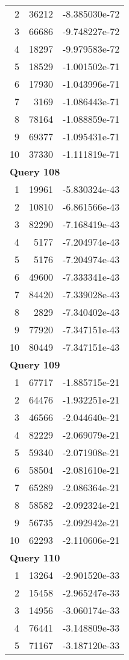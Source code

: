 \begin{longtable}[{p}]{@{}rrp{}@{}}
2 & 36212 & -8.385030e-72 \\
3 & 66686 & -9.748227e-72 \\
4 & 18297 & -9.979583e-72 \\
5 & 18529 & -1.001502e-71 \\
6 & 17930 & -1.043996e-71 \\
7 & 3169 & -1.086443e-71 \\
8 & 78164 & -1.088859e-71 \\
9 & 69377 & -1.095431e-71 \\
10 & 37330 & -1.111819e-71 \\
\midrule
\multicolumn{3}{l}{\bfseries Query 108} \\
1 & 19961 & -5.830324e-43 \\
2 & 10810 & -6.861566e-43 \\
3 & 82290 & -7.168419e-43 \\
4 & 5177 & -7.204974e-43 \\
5 & 5176 & -7.204974e-43 \\
6 & 49600 & -7.333341e-43 \\
7 & 84420 & -7.339028e-43 \\
8 & 2829 & -7.340402e-43 \\
9 & 77920 & -7.347151e-43 \\
10 & 80449 & -7.347151e-43 \\
\midrule
\multicolumn{3}{l}{\bfseries Query 109} \\
1 & 67717 & -1.885715e-21 \\
2 & 64476 & -1.932251e-21 \\
3 & 46566 & -2.044640e-21 \\
4 & 82229 & -2.069079e-21 \\
5 & 59340 & -2.071908e-21 \\
6 & 58504 & -2.081610e-21 \\
7 & 65289 & -2.086364e-21 \\
8 & 58582 & -2.092324e-21 \\
9 & 56735 & -2.092942e-21 \\
10 & 62293 & -2.110606e-21 \\
\midrule
\multicolumn{3}{l}{\bfseries Query 110} \\
1 & 13264 & -2.901520e-33 \\
2 & 15458 & -2.965247e-33 \\
3 & 14956 & -3.060174e-33 \\
4 & 76441 & -3.148809e-33 \\
5 & 71167 & -3.187120e-33 \\

\end{longtable}
